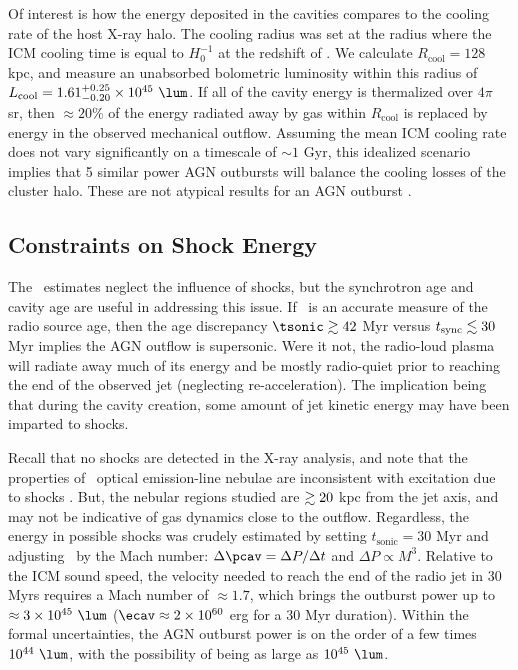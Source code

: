 \documentclass[useAMS,usenatbib]{mn2e}
\begin{document}
Of interest is how the energy deposited in the cavities compares to
the cooling rate of the host X-ray halo. The cooling radius was set at
the radius where the ICM cooling time is equal to $H_0^{-1}$ at the
redshift of \irs. We calculate $R_{\mathrm{cool}} = 128$ kpc, and
measure an unabsorbed bolometric luminosity within this radius of
$L_{\mathrm{cool}} = 1.61^{+0.25}_{-0.20} \times 10^{45} ~\lum$. If
all of the cavity energy is thermalized over $4\pi$ sr, then $\approx
20\%$ of the energy radiated away by gas within $R_{\mathrm{cool}}$ is
replaced by energy in the observed mechanical outflow. Assuming the
mean ICM cooling rate does not vary significantly on a timescale of
$\sim 1$ Gyr, this idealized scenario implies that 5 similar power AGN
outbursts will balance the cooling losses of the cluster halo. These
are not atypical results for an AGN outburst
\citep[\eg][]{rafferty06}.

\subsection{Constraints on Shock Energy}

The \pcav\ estimates neglect the influence of shocks, but the
synchrotron age and cavity age are useful in addressing this issue. If
\tsync\ is an accurate measure of the radio source age, then the age
discrepancy $\tsonic \ga 42$ Myr versus $t_{\mathrm{sync}} \lesssim 30$ Myr implies
the AGN outflow is supersonic. Were it not, the radio-loud plasma will
radiate away much of its energy and be mostly radio-quiet prior to
reaching the end of the observed jet (neglecting re-acceleration). The
implication being that during the cavity creation, some amount of jet
kinetic energy may have been imparted to shocks.

Recall that no shocks are detected in the X-ray analysis, and note
that the properties of \irs\ optical emission-line nebulae are
inconsistent with excitation due to shocks \citep{1996MNRAS.283.1003C,
  2000AJ....120..562T}. But, the nebular regions studied are $\gtrsim 20$
kpc from the jet axis, and may not be indicative of gas dynamics close
to the outflow. Regardless, the energy in possible shocks was crudely
estimated by setting $t_{\mathrm{sonic}} = 30$ Myr and adjusting
\pcav\ by the Mach number: $\Delta \pcav = \Delta P / \Delta t$ and
$\Delta P \propto M^3$. Relative to the ICM sound speed, the velocity
needed to reach the end of the radio jet in 30 Myrs requires a Mach
number of $\approx 1.7$, which brings the outburst power up to
$\approx 3 \times 10^{45} ~\lum$ ($\ecav \approx 2 \times 10^{60}$ erg
for a 30 Myr duration). Within the formal uncertainties, the AGN
outburst power is on the order of a few times $10^{44} ~\lum$, with
the possibility of being as large as $10^{45} ~\lum$.
\end{document}
